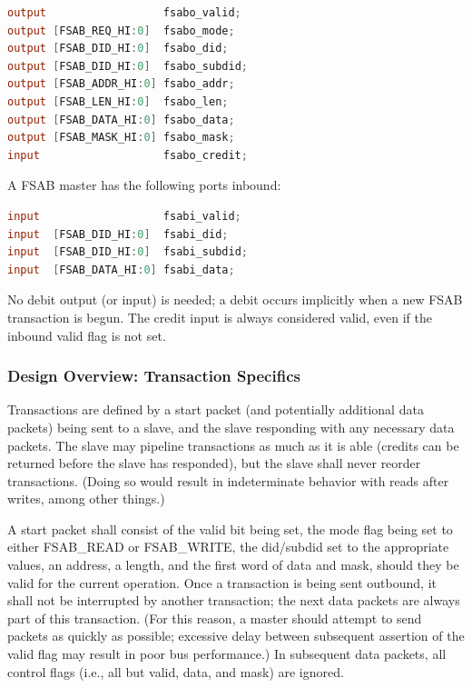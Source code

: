 \documentclass[10pt]{report}
\begin{document}
\begin{lstlisting}[basicstyle=\footnotesize,language=Verilog]
output                  fsabo_valid;
output [FSAB_REQ_HI:0]  fsabo_mode;
output [FSAB_DID_HI:0]  fsabo_did;
output [FSAB_DID_HI:0]  fsabo_subdid;
output [FSAB_ADDR_HI:0] fsabo_addr;
output [FSAB_LEN_HI:0]  fsabo_len;
output [FSAB_DATA_HI:0] fsabo_data;
output [FSAB_MASK_HI:0] fsabo_mask;
input                   fsabo_credit;
\end{lstlisting}

A FSAB master has the following ports inbound:

\begin{lstlisting}[basicstyle=\footnotesize,language=Verilog]
input                   fsabi_valid;
input  [FSAB_DID_HI:0]  fsabi_did;
input  [FSAB_DID_HI:0]  fsabi_subdid;
input  [FSAB_DATA_HI:0] fsabi_data;
\end{lstlisting}

No debit output (or input) is needed; a debit occurs implicitly when a new
FSAB transaction is begun. The credit input is always considered valid, even
if the inbound valid flag is not set.

\subsubsection{Design Overview: Transaction Specifics}

Transactions are defined by a start packet (and potentially additional data
packets) being sent to a slave, and the slave responding with any necessary
data packets. The slave may pipeline transactions as much as it is able
(credits can be returned before the slave has responded), but the slave
shall never reorder transactions. (Doing so would result in indeterminate
behavior with reads after writes, among other things.)

A start packet shall consist of the valid bit being set, the mode flag being
set to either FSAB\_READ or FSAB\_WRITE, the did/subdid set to the appropriate
values, an address, a length, and the first word of data and mask, should
they be valid for the current operation. Once a transaction is being sent
outbound, it shall not be interrupted by another transaction; the next data
packets are always part of this transaction. (For this reason, a master
should attempt to send packets as quickly as possible; excessive delay
between subsequent assertion of the valid flag may result in poor bus
performance.) In subsequent data packets, all control flags (i.e., all but
valid, data, and mask) are ignored.
\end{document}
